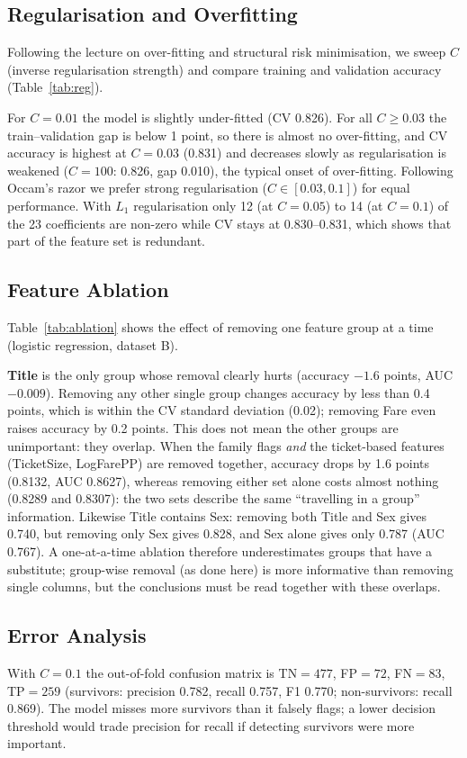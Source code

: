 \documentclass[10pt,twocolumn]{article}
\begin{document}
\subsection{Regularisation and Overfitting}\label{sec:reg}
Following the lecture on over-fitting and structural risk minimisation, we sweep $C$ (inverse regularisation strength) and compare training and validation accuracy (Table~\ref{tab:reg}).

For $C=0.01$ the model is slightly under-fitted (CV 0.826). For all $C\ge0.03$ the train--validation gap is below 1 point, so there is almost no over-fitting, and CV accuracy is highest at $C=0.03$ (0.831) and decreases slowly as regularisation is weakened ($C=100$: 0.826, gap 0.010), the typical onset of over-fitting. Following Occam's razor we prefer strong regularisation ($C\in[0.03,0.1]$) for equal performance. With $L_1$ regularisation only 12 (at $C=0.05$) to 14 (at $C=0.1$) of the 23 coefficients are non-zero while CV stays at 0.830--0.831, which shows that part of the feature set is redundant.

\subsection{Feature Ablation}\label{sec:ablation}
Table~\ref{tab:ablation} shows the effect of removing one feature group at a time (logistic regression, dataset B).

\textbf{Title} is the only group whose removal clearly hurts (accuracy $-1.6$ points, AUC $-0.009$). Removing any other single group changes accuracy by less than 0.4 points, which is within the CV standard deviation (0.02); removing Fare even raises accuracy by 0.2 points. This does not mean the other groups are unimportant: they overlap. When the family flags \emph{and} the ticket-based features (TicketSize, LogFarePP) are removed together, accuracy drops by 1.6 points (0.8132, AUC 0.8627), whereas removing either set alone costs almost nothing (0.8289 and 0.8307): the two sets describe the same ``travelling in a group'' information. Likewise Title contains Sex: removing both Title and Sex gives 0.740, but removing only Sex gives 0.828, and Sex alone gives only 0.787 (AUC 0.767). A one-at-a-time ablation therefore underestimates groups that have a substitute; group-wise removal (as done here) is more informative than removing single columns, but the conclusions must be read together with these overlaps.

\subsection{Error Analysis}
With $C=0.1$ the out-of-fold confusion matrix is TN$=477$, FP$=72$, FN$=83$, TP$=259$ (survivors: precision 0.782, recall 0.757, F1 0.770; non-survivors: recall 0.869). The model misses more survivors than it falsely flags; a lower decision threshold would trade precision for recall if detecting survivors were more important.
\end{document}
